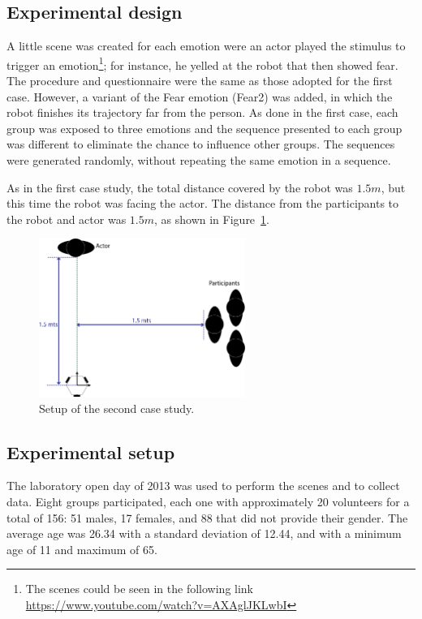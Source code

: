 \subsection{Experimental design}

A little scene was created for each emotion were an actor played the stimulus to trigger an emotion\footnote{The scenes could be seen in the following link \url{https://www.youtube.com/watch?v=AXAglJKLwbI}}; for instance, he yelled at the robot that then showed fear. The procedure and questionnaire were the same as those adopted for the first case. However, a variant of the Fear emotion (Fear2) was added, in which the robot finishes its trajectory far from the person. As done in the first case, each group was exposed to three emotions and the sequence presented to each group was different to eliminate the chance to influence other groups. The sequences were generated randomly, without repeating the same emotion in a sequence.

As in the first case study, the total distance covered by the robot was $1.5 m$, but this time the robot was facing the actor. The distance from the participants to the robot and actor was $1.5 m$, as shown in Figure~\ref{fig:setup2}. 

\begin{figure}[h]
	\centering
	\includegraphics[width=0.6\textwidth]{./Images/SecondCase.png} 
	\caption{Setup of the second case study.}
	\label{fig:setup2}
\end{figure}
\subsection{Experimental setup}

The laboratory open day of 2013 was used to perform the scenes and to collect data. Eight groups participated, each one with approximately 20 volunteers for a total of 156: 51 males, 17 females, and 88 that did not provide their gender. The average age was 26.34 with a standard deviation of 12.44, and with a minimum age of 11 and maximum of 65.

